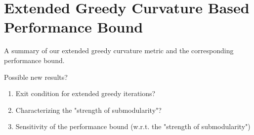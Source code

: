 \documentclass[letterpaper, 10 pt, conference]{ieeeconf}
\begin{document}





\section{Extended Greedy Curvature Based Performance Bound}
\label{Sec:NewPerformanceBound}


A summary of our extended greedy curvature metric and the corresponding performance bound. 


Possible new results?
\begin{enumerate}
    \item Exit condition for extended greedy iterations?
    \item Characterizing the "strength of submodularity"?
    \item Sensitivity of the performance bound (w.r.t. the "strength of submodularity")    
\end{enumerate}



\end{document}
